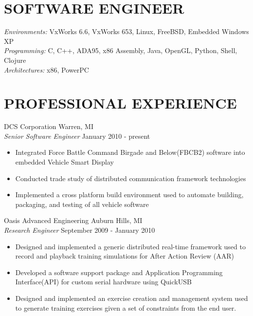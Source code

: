 \documentclass[line]{res}
\begin{document}
\address{724 East 2nd St, Royal Oak, MI 48067}
\address{mathew.prokos@gmail.com}

\begin{resume}
\section{SOFTWARE ENGINEER}
    {\sl Environments:} VxWorks 6.6, VxWorks 653, Linux, FreeBSD, Embedded Windows XP\\
    {\sl Programming:} C, C++, ADA95, x86 Assembly, Java, OpenGL, Python, Shell, Clojure\\
    {\sl Architectures:} x86, PowerPC

\section{PROFESSIONAL EXPERIENCE}
    \vspace{1mm}
    DCS Corporation \hfill Warren, MI\\
    {\sl Senior Software Engineer} \hfill January 2010 - present
    \vspace{1mm}
    \begin{itemize} 
    \item Integrated Force Battle Command Birgade and Below(FBCB2) software
      into embedded Vehicle Smart Display
    \item Conducted trade study of distributed communication framework technologies  
    \item Implemented a cross platform build environment used to automate 
      building, packaging, and testing of all vehicle software 
    \end{itemize}

    \vspace{-2mm}
    Oasis Advanced Engineering \hfill Auburn Hills, MI\\
    {\sl Research Engineer} \hfill September 2009 - January 2010
    \vspace{1mm}
    \begin{itemize} 
    \item Designed and implemented a generic distributed real-time framework 
      used to record and playback training simulations for After Action Review (AAR)
    \item Developed a software support package and Application Programming Interface(API)
      for custom serial hardware using QuickUSB   
    \item Designed and implemented an exercise creation and management system used
      to generate training exercises given a set of constraints from the end user. 
    \end{itemize}


\end{resume}
\end{document}
